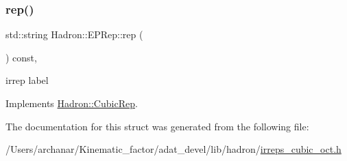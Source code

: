 \subsubsection{\texorpdfstring{rep()}{rep()}\hspace{0.1cm}{\footnotesize\ttfamily [2/2]}}
{\footnotesize\ttfamily std\+::string Hadron\+::\+E\+P\+Rep\+::rep (\begin{DoxyParamCaption}{ }\end{DoxyParamCaption}) const\hspace{0.3cm}{\ttfamily [inline]}, {\ttfamily [virtual]}}

irrep label 

Implements \mbox{\hyperlink{structHadron_1_1CubicRep_ac3eb63608803d44c68681f158e14eb1b}{Hadron\+::\+Cubic\+Rep}}.



The documentation for this struct was generated from the following file\+:\begin{DoxyCompactItemize}
\item 
/\+Users/archanar/\+Kinematic\+\_\+factor/adat\+\_\+devel/lib/hadron/\mbox{\hyperlink{lib_2hadron_2irreps__cubic__oct_8h}{irreps\+\_\+cubic\+\_\+oct.\+h}}\end{DoxyCompactItemize}
